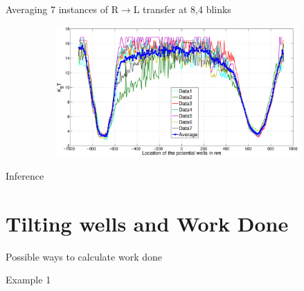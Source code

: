 \documentclass{beamer}
\begin{document}
\begin{frame}{Averaging 7 instances of R$\rightarrow$L transfer at 8,4 blinks} 

\begin{figure}
    \centering
    \includegraphics[height=5cm,width=11cm]{Mean_of_the_seven_potential_wells_probb1.eps}
    \label{fig:graph27}
\end{figure}

\end{frame}

\begin{frame}{Inference} 


\end{frame}


\section{Tilting wells and Work Done}
\begin{frame}{Possible ways to calculate work done} 


\end{frame}
\begin{frame}{Example 1} 


\end{frame}



\end{document}
